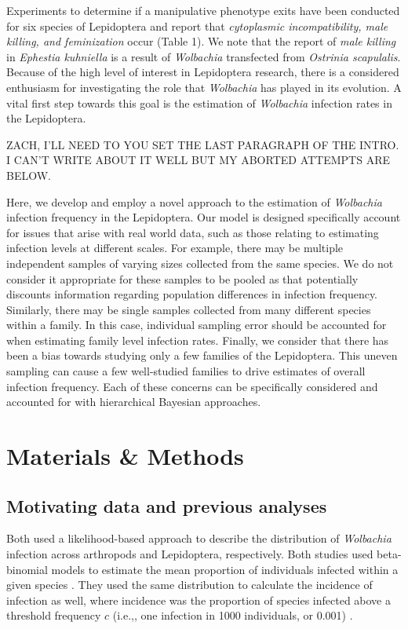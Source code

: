 \documentclass[12pt]{article}
\begin{document}
Experiments to determine if a manipulative phenotype exits have been conducted for six species of Lepidoptera and report that \emph{cytoplasmic incompatibility, male killing, \emph{and} feminization} occur (Table 1). We note that the report of \textit{male killing} in \textit{Ephestia kuhniella} is a result of \textit{Wolbachia} transfected from \textit{Ostrinia scapulalis}. Because of the high level of interest in Lepidoptera research, there is a considered enthusiasm for investigating the role that \textit{Wolbachia} has played in its evolution. A vital first step towards this goal is the estimation of \textit{Wolbachia} infection rates in the Lepidoptera. 

ZACH, I'LL NEED TO YOU SET THE LAST PARAGRAPH OF THE INTRO. I CAN'T WRITE ABOUT IT WELL BUT MY ABORTED ATTEMPTS ARE BELOW.

Here, we develop and employ a novel approach to the estimation of \textit{Wolbachia} infection frequency in the Lepidoptera. Our model is designed specifically account for issues that arise with real world data, such as those relating to estimating infection levels at different scales. For example, there may be multiple independent samples of varying sizes collected from the same species. We do not consider it appropriate for these samples to be pooled as that potentially discounts information regarding population differences in infection frequency. Similarly, there may be single samples collected from many different species within a family. In this case, individual sampling error should be accounted for when estimating family level infection rates. Finally, we consider that there has been a bias towards studying only a few families of the Lepidoptera. This uneven sampling can cause a few well-studied families to drive estimates of overall infection frequency. Each of these concerns can be specifically considered and accounted for with hierarchical Bayesian approaches. 




\section{Materials \& Methods}
\subsection{Motivating data and previous analyses}

 Both \cite{Weinert:2015aa} \cite{Ahmed:2015aa} used a likelihood-based approach to describe the distribution of \emph{Wolbachia} infection across arthropods and Lepidoptera, respectively. Both studies used beta-binomial models to estimate the mean proportion of individuals infected within a given species \citep{Hilgenboecker:2008aa}. They used the same distribution to calculate the incidence of infection as well, where incidence was the proportion of species infected above a threshold frequency $c$ (i.e.,, one infection in 1000 individuals, or 0.001) \citep{Weinert:2015aa}. 
\end{document}
